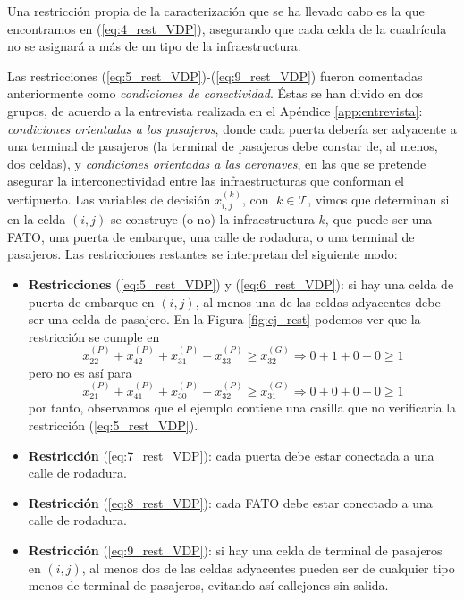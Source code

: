 \documentclass[12pt,a4paper]{book}
\begin{document}
Una restricción propia de la caracterización que se ha llevado cabo es la que encontramos en (\ref{eq:4_rest_VDP}), asegurando que cada celda de la cuadrícula no se asignará a más de un tipo de la infraestructura. 

Las restricciones (\ref{eq:5_rest_VDP})-(\ref{eq:9_rest_VDP}) fueron comentadas anteriormente como \textsl{condiciones de conectividad}. Éstas se han divido en dos grupos, de acuerdo a la entrevista realizada en el Apéndice \ref{app:entrevista}: \textsl{condiciones orientadas a los pasajeros}, donde cada puerta debería ser adyacente a una terminal de pasajeros (la terminal de pasajeros debe constar de, al menos, dos celdas), y \textsl{condiciones orientadas a las aeronaves}, en las que se pretende asegurar la interconectividad entre las infraestructuras que conforman el vertipuerto. Las variables de decisión $x_{i,j}^{(k)}$, con $ \; k \in \mathcal{T}$, vimos que determinan si en la celda $(i,j)$ se construye (o no) la infraestructura $k$, que puede ser una FATO, una puerta de embarque, una calle de rodadura, o una terminal de pasajeros. Las restricciones restantes se interpretan del siguiente modo:
\begin{itemize}
	\item \textbf{Restricciones} (\ref{eq:5_rest_VDP}) y (\ref{eq:6_rest_VDP}): si hay una celda de puerta de embarque en $(i,j)$, al menos una de las celdas adyacentes debe ser una celda de pasajero. En la Figura \ref{fig:ej_rest} podemos ver que la restricción se cumple en 
	\begin{equation}
	  x_{22}^{(P)}+x_{42}^{(P)}+x_{31}^{(P)} + x_{33}^{(P)} \geq x_{32}^{(G)} \Rightarrow 0+1+0+0 \geq 1 
	\end{equation}
pero no es así para
	\begin{equation}
	  x_{21}^{(P)}+x_{41}^{(P)}+x_{30}^{(P)} + x_{32}^{(P)} \geq x_{31}^{(G)} \Rightarrow 0+0+0+0 \geq 1 
	\end{equation}
por tanto, observamos que el ejemplo contiene una casilla que no verificaría la restricción (\ref{eq:5_rest_VDP}).
	
	\item \textbf{Restricción} (\ref{eq:7_rest_VDP}): cada puerta debe estar conectada a una calle de rodadura. 
	\item \textbf{Restricción} (\ref{eq:8_rest_VDP}): cada FATO debe estar conectado a una calle de rodadura.
	\item \textbf{Restricción} (\ref{eq:9_rest_VDP}): si hay una celda de terminal de pasajeros en $(i,j)$, al menos dos de las celdas adyacentes pueden ser de cualquier tipo menos de terminal de pasajeros, evitando así callejones sin salida. 
\end{itemize}
\end{document}
